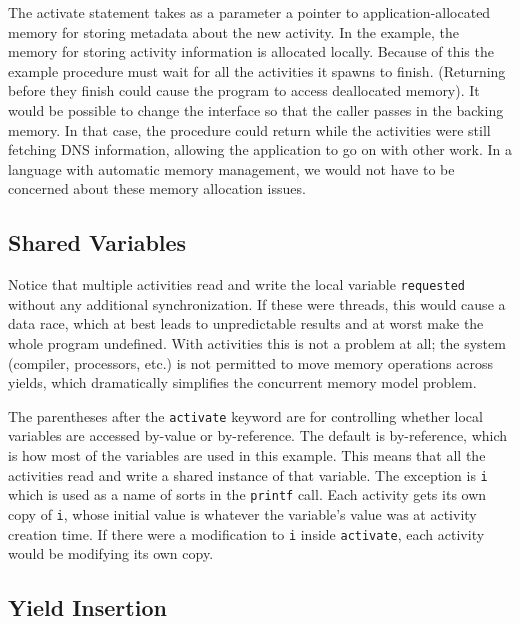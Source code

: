 \documentclass[9pt,preprint]{sigplanconf-2}
\begin{document}
The activate statement takes as a parameter a pointer to application-allocated memory for storing metadata about the new activity.
In the example, the memory for storing activity information is allocated locally.
Because of this the example procedure must wait for all the activities it spawns to finish.
(Returning before they finish could cause the program to access deallocated memory).
It would be possible to change the interface so that the caller passes in the backing memory.
In that case, the procedure could return while the activities were still fetching DNS information, allowing the application to go on with other work.
In a language with automatic memory management, we would not have to be concerned about these memory allocation issues.


\subsection{Shared Variables}

Notice that multiple activities read and write the local variable \texttt{requested} without any additional synchronization.
If these were threads, this would cause a data race, which at best leads to unpredictable results and at worst make the whole program undefined.
With activities this is not a problem at all; the system (compiler, processors, etc.) is not permitted to move memory operations across yields, which dramatically simplifies the concurrent memory model problem.

The parentheses after the \texttt{activate} keyword are for controlling whether local variables are accessed by-value or by-reference.
The default is by-reference, which is how most of the variables are used in this example.
This means that all the activities read and write a shared instance of that variable.
The exception is \texttt{i} which is used as a name of sorts in the \texttt{printf} call.
Each activity gets its own copy of \texttt{i}, whose initial value is whatever the variable's value was at activity creation time.
If there were a modification to \texttt{i} inside \texttt{activate}, each activity would be modifying its own copy.

\subsection{Yield Insertion}
\end{document}
